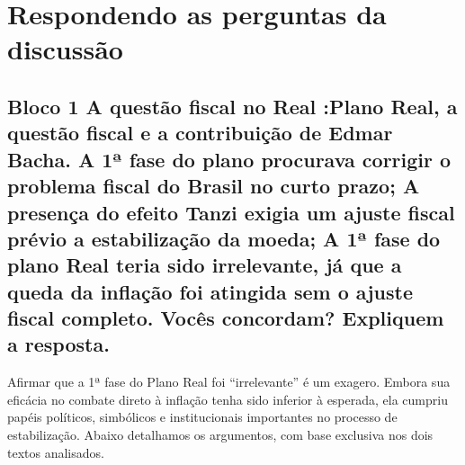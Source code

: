 \documentclass[a4paper,12pt]{article}[abntex2]
\begin{document}
\newpage
\section{\textbf{Respondendo as perguntas da discussão}}
\subsection{\textbf{Bloco 1 A questão fiscal no Real :Plano Real, a questão fiscal e a contribuição de Edmar Bacha. A 1ª fase do plano procurava corrigir o problema fiscal do Brasil no curto prazo; A presença do efeito Tanzi exigia um ajuste fiscal prévio a estabilização da moeda; A 1ª fase do plano Real teria sido irrelevante, já que a queda da inflação foi atingida sem o ajuste fiscal completo. Vocês concordam? Expliquem a resposta.}}

Afirmar que a 1ª fase do Plano Real foi “irrelevante” é um exagero. Embora sua eficácia no combate direto à inflação tenha sido inferior à esperada, ela cumpriu papéis políticos, simbólicos e institucionais importantes no processo de estabilização. Abaixo detalhamos os argumentos, com base exclusiva nos dois textos analisados.
\end{document}

